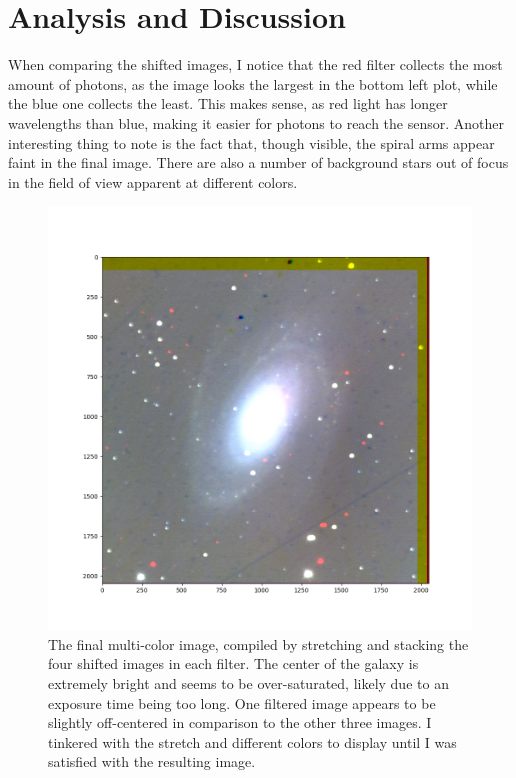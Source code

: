 \documentclass[]{aastex63}
\begin{document}
\section{Analysis and Discussion}
When comparing the shifted images, I notice that the red filter collects the most amount of photons, as the image looks the largest in the bottom left plot, while the blue one collects the least. This makes sense, as red light has longer wavelengths than blue, making it easier for photons to reach the sensor. Another interesting thing to note is the fact that, though visible, the spiral arms appear faint in the final image. There are also a number of background stars out of focus in the field of view apparent at different colors.

\begin{figure}[h]
   \centering
    \includegraphics[scale=.4]{final_mci_image.png}
    \caption{The final multi-color image, compiled by stretching and stacking the four shifted images in each filter. The center of the galaxy is extremely bright and seems to be over-saturated, likely due to an exposure time being too long. One filtered image appears to be slightly off-centered in comparison to the other three images. I tinkered with the stretch and different colors to display until I was satisfied with the resulting image.}
    \label{fig:final}
\end{figure}
\end{document}
